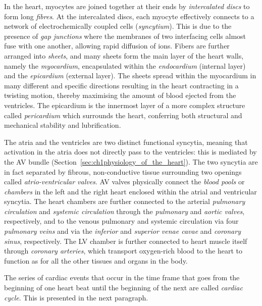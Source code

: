 \vspace{0.2cm}
In the heart, myocytes are joined together at their ends by \textit{intercalated discs} to form long \textit{fibres}. At the intercalated discs, each myocyte effectively connects to a network of electrochemically coupled cells (\textit{syncytium}). This is due to the presence of \textit{gap junctions} where the membranes of two interfacing cells almost fuse with one another, allowing rapid diffusion of ions. Fibers are further arranged into \textit{sheets}, and many sheets form the main layer of the heart walls, namely the \textit{myocardium}, encapsulated within the \textit{endocardium} (internal layer) and the \textit{epicardium} (external layer). The sheets spread within the myocardium in many different and specific directions resulting in the heart contracting in a twisting motion, thereby maximising the amount of blood ejected from the ventricles. The epicardium is the innermost layer of a more complex structure called \textit{pericardium} which surrounds the heart, conferring both structural and mechanical stability and lubrification.

\vspace{0.2cm}
The atria and the ventricles are two distinct functional syncytia, meaning that activation in the atria does not directly pass to the ventricles: this is mediated by the AV bundle (Section~\ref{sec:ch1physiology_of_the_heart}). The two syncytia are in fact separated by fibrous, non-conductive tissue surrounding two openings called \textit{atrio-ventricular valves}. AV valves physically connect the \textit{blood pools} or \textit{chambers} in the left and the right heart enclosed within the atrial and ventricular syncytia. The heart chambers are further connected to the arterial \textit{pulmonary circulation} and \textit{systemic circulation} through the \textit{pulmonary} and \textit{aortic valves}, respectively, and to the venous pulmonary and systemic circulation via four \textit{pulmonary veins} and via the \textit{inferior} and \textit{superior venae cavae} and \textit{coronary sinus}, respectively. The LV chamber is further connected to heart muscle itself through \textit{coronary arteries}, which transport oxygen-rich blood to the heart to function as for all the other tissues and organs in the body. 

\vspace{0.2cm}
The series of cardiac events that occur in the time frame that goes from the beginning of one heart beat until the beginning of the next are called \textit{cardiac cycle}. This is presented in the next paragraph.


